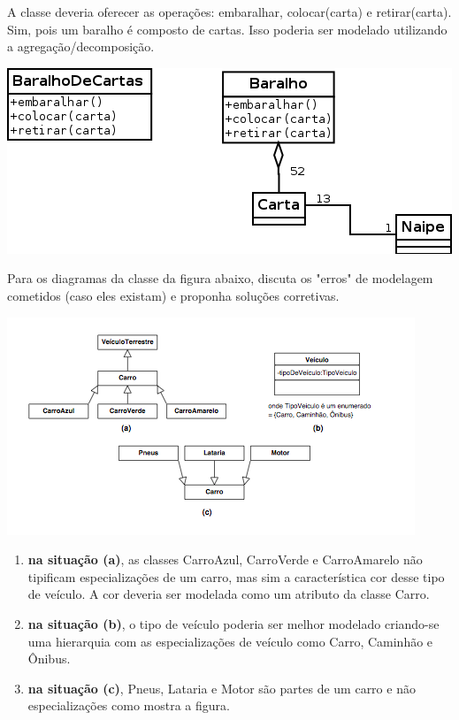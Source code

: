 \documentclass[12pt]{exam}
\begin{document}
\begin{questions}
\begin{solution}
        A classe deveria oferecer as operações: embaralhar, colocar(carta) e retirar(carta). Sim, pois um baralho é composto de cartas. Isso poderia ser modelado utilizando a agregação/decomposição.
        \begin{center}
	       \includegraphics[width=.8\textwidth]{./exercicios-capitulo1-e7.png}
        \end{center}
      \end{solution}

      \question 
        Para os diagramas da classe da figura abaixo, discuta os "erros"  de modelagem cometidos (caso eles existam) e proponha soluções corretivas.

        \begin{center}
	       \includegraphics[width=.8\textwidth]{./figura-com-erros-de-modelagem.png}
        \end{center}
      
        \begin{solution}
          \begin{enumerate}[(i.)]
           \item \textbf{na situação (a)}, as classes CarroAzul, CarroVerde e CarroAmarelo não tipificam especializações de um carro, mas sim a característica cor
            desse tipo de veículo. A cor deveria ser modelada como um atributo da classe Carro.
           \item \textbf{na situação (b)}, o tipo de veículo poderia ser melhor modelado criando-se uma hierarquia com as especializações de veículo
           como Carro, Caminhão e Ônibus.
           \item \textbf{na situação (c)}, Pneus, Lataria e Motor são partes de um carro e não especializações como mostra a figura.
           \end{enumerate}
        \end{solution}


\end{questions}
\end{document}
